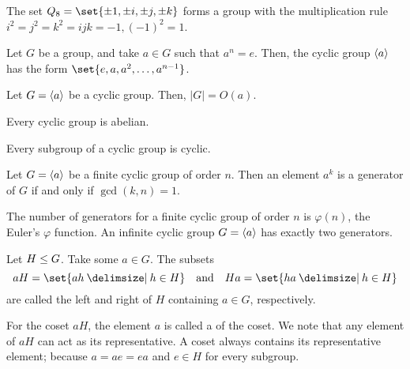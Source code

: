 \documentclass[11pt]{penrose}
\begin{document}
\begin{nthm}
    The set $Q_8 = \set{\pm 1, \pm i, \pm j, \pm k}$ forms a group with the multiplication rule $i^2 = j^2 = k^2 = ijk = -1, (-1)^2 = 1$.
\end{nthm}

\begin{nthm}\label{thm:cyclic-finite-form}
    Let $G$ be a group, and take $a \in G$ such that $a^n = e$. Then, the cyclic group $\langle a\rangle$ has the form $\set{e, a, a^2, \dots, a^{n-1}}$.
\end{nthm}

\begin{nthm}\label{thm:cyclic-group-order}
    Let $G = \langle a\rangle$ be a cyclic group. Then, $|G| = O(a)$.
\end{nthm}

\begin{nthm}
    Every cyclic group is abelian.
\end{nthm}

\begin{nthm}
    Every subgroup of a cyclic group is cyclic.
\end{nthm}

\begin{nthm}
    Let $G = \langle a\rangle$ be a finite cyclic group of order $n$. Then an element $a^k$ is a generator of $G$ if and only if $\gcd(k,n) = 1$.
\end{nthm}

\begin{nthm}
    The number of generators for a finite cyclic group of order $n$ is $\varphi(n)$, the Euler's $\varphi$ function. An infinite cyclic group $G = \langle a\rangle$ has exactly two generators.
\end{nthm}

\begin{ndfn}
    Let $H \mathrel{\leq} G$. Take some $a \in G$. The subsets
    \begin{equation*}
        aH = \set{ah \st h \in H}
        \quad\text{and}\quad
        Ha = \set{ha \st h \in H}
    \end{equation*}
    are called the left and right  of $H$ containing $a \in G$, respectively.
\end{ndfn}

For the coset $aH$, the element $a$ is called a  of the coset. We note that any element of $aH$ can act as its representative. A coset always contains its representative element; because $a = a e = e a$ and $e \in H$ for every subgroup.
\end{document}
